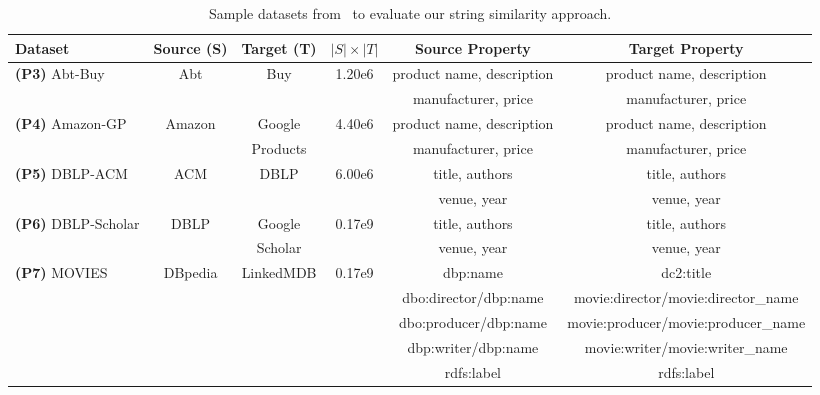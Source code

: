 \documentclass[sw]{iosart2x}
\begin{document}
\begin{table}[htb]
\centering
\caption{Sample datasets from~\cite{georgala2018dynamic} to evaluate our string similarity approach.}
\label{tab:TableFmeasure}
\resizebox{1.0\textwidth}{!}
{
\begin{tabular}{lccS[table-format=1.2e1]cc}
    \toprule
    \textbf{Dataset}           & \textbf{Source (S)} & \textbf{Target (T)} & \textbf{$|S| \times |T|$} & \textbf{Source Property} & \textbf{Target Property}                           \\ \midrule
    
    \textbf{(P3)} Abt-Buy    & Abt & Buy  & 1.20e6 & product name, description                       & product name, description                         \\
                                &&&& manufacturer, price               & manufacturer, price                       \\ \midrule
    \textbf{(P4)} Amazon-GP  & Amazon & Google & 4.40e6 & product name, description                 & product name, description                         \\ 
                                && Products && manufacturer, price               & manufacturer, price                       \\ \midrule
    \textbf{(P5)} DBLP-ACM  & ACM & DBLP& 6.00e6 & title, authors                    & title, authors                            \\
                                &&&& venue, year                       & venue, year                               \\ \midrule
    \textbf{(P6)} DBLP-Scholar& DBLP & Google  & 0.17e9 & title, authors                    & title, authors                            \\
                                && Scholar && venue, year                       & venue, year                               \\ \midrule
    \textbf{(P7)} MOVIES   & DBpedia & LinkedMDB & 0.17e9 & dbp:name                          & dc2:title     \\
                                &&&& dbo:director/dbp:name             & movie:director/movie:director\_name       \\
                                &&&& dbo:producer/dbp:name             & movie:producer/movie:producer\_name       \\
                                &&&& dbp:writer/dbp:name            & movie:writer/movie:writer\_name           \\
                                &&&& rdfs:label & rdfs:label           \\ 
    \bottomrule
\end{tabular}
}
\end{table}
\end{document}
